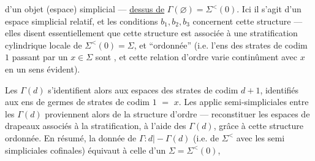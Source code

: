 d'un objet (espace) simplicial --- \uline{dessus de}
$\Gamma(\varnothing)=\Sigma^{<}(0)$. Ici il s'agit d'un espace
simplicial relatif, et les conditions $b_1,b_2,b_3$
concernent cette structure --- elles disent
essentiellement que cette structure est associée
à une stratification cylindrique locale de
$\Sigma^{<}(0)=\Sigma$, et ``ordonnée'' (i.e. l'ens des
strates de codim $1$ passant par un $x\in\Sigma$ sont
 , et cette relation d'ordre varie
continûment avec $x$ en un sens évident).

Les  $\Gamma(d)$ s'identifient alors
aux  espaces des  strates de codim
$d+1$,   identifiés  aux ens de germes de strates
de codim $1$   $=$ $x$. Les applic
semi-simpliciales entre les $\Gamma(d)$ proviennent
alors de la structure d'ordre --- 
 reconstituer les espaces de drapeaux
associés à la stratification, à l'aide des
 $\Gamma(d)$, grâce à cette structure ordonnée.
En résumé, la donnée de $\Gamma:d\mathrel{\mid\! -\!}\Gamma(d)$
 (i.e. de $\Sigma^{<}$ avec les  semi simpliciales
cofinales) équivaut à celle d'un $\Sigma=\Sigma^{<}(0)$,
